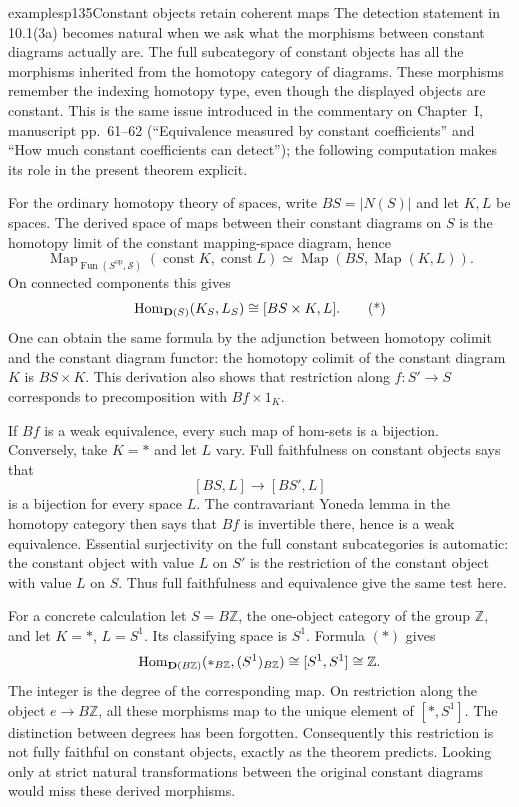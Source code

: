 \begin{dcomment}{examples}{p135}{Constant objects retain coherent maps}
The detection statement in 10.1(3a) becomes natural when we ask what the morphisms between constant diagrams actually are. The full subcategory of constant objects has all the morphisms inherited from the homotopy category of diagrams. These morphisms remember the indexing homotopy type, even though the displayed objects are constant. This is the same issue introduced in the commentary on Chapter~I, manuscript pp.~61--62 (``Equivalence measured by constant coefficients'' and ``How much constant coefficients can detect''); the following computation makes its role in the present theorem explicit.

For the ordinary homotopy theory of spaces, write $BS=|N(S)|$ and let $K,L$ be spaces. The derived space of maps between their constant diagrams on $S$ is the homotopy limit of the constant mapping-space diagram, hence
\[
 \operatorname{Map}_{\operatorname{Fun}(S^{\mathrm{op}},\mathcal S)}
       (\operatorname{const}K,\operatorname{const}L)
 \simeq \operatorname{Map}(BS,\operatorname{Map}(K,L)).
\]
On connected components this gives
\[
 \mathrm{Hom}_{\mathbf D(S)}(K_S,L_S)\cong[BS\times K,L].\tag{*}
\]
One can obtain the same formula by the adjunction between homotopy colimit and the constant diagram functor: the homotopy colimit of the constant diagram $K$ is $BS\times K$. This derivation also shows that restriction along $f:S'\longrightarrow S$ corresponds to precomposition with $Bf\times1_K$.

If $Bf$ is a weak equivalence, every such map of hom-sets is a bijection. Conversely, take $K=*$ and let $L$ vary. Full faithfulness on constant objects says that
\[
 [BS,L]\longrightarrow[BS',L]
\]
is a bijection for every space $L$. The contravariant Yoneda lemma in the homotopy category then says that $Bf$ is invertible there, hence is a weak equivalence. Essential surjectivity on the full constant subcategories is automatic: the constant object with value $L$ on $S'$ is the restriction of the constant object with value $L$ on $S$. Thus full faithfulness and equivalence give the same test here.

For a concrete calculation let $S=B\mathbb Z$, the one-object category of the group $\mathbb Z$, and let $K=*$, $L=S^1$. Its classifying space is $S^1$. Formula $(*)$ gives
\[
 \mathrm{Hom}_{\mathbf D(B\mathbb Z)}(*_{B\mathbb Z},(S^1)_{B\mathbb Z})
 \cong[S^1,S^1]\cong\mathbb Z.
\]
The integer is the degree of the corresponding map. On restriction along the object $e\longrightarrow B\mathbb Z$, all these morphisms map to the unique element of $[*,S^1]$. The distinction between degrees has been forgotten. Consequently this restriction is not fully faithful on constant objects, exactly as the theorem predicts. Looking only at strict natural transformations between the original constant diagrams would miss these derived morphisms.


\end{dcomment}
